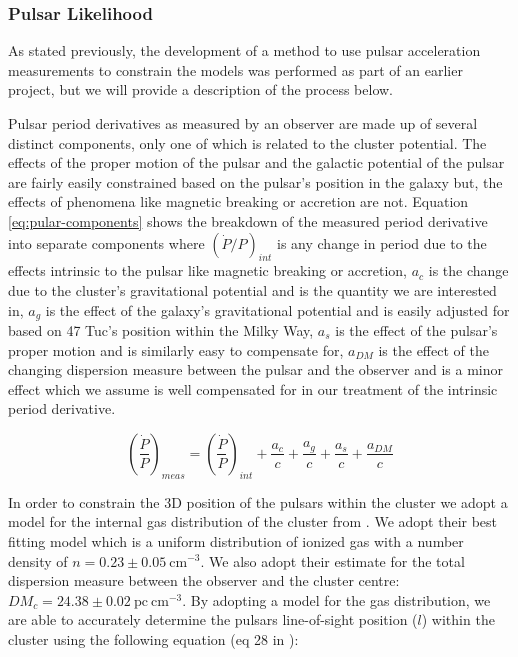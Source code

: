 \subsubsection{Pulsar Likelihood}

As stated previously, the development of a method to use pulsar acceleration measurements to
constrain the models was performed as part of an earlier project, but we will provide a description
of the process below.




Pulsar period derivatives as measured by an observer are made up of several distinct components,
only one of which is related to the cluster potential. The effects of the proper motion of the
pulsar and the galactic potential of the pulsar are fairly easily constrained based on the pulsar's
position in the galaxy but, the effects of phenomena like magnetic breaking or accretion are not.
Equation \ref{eq:pular-components} shows the breakdown of the measured period derivative into
separate components where $(\dot{P}/P)_{int}$ is any change in period due to the effects intrinsic
to the pulsar like magnetic breaking or accretion, $a_c$ is the change due to the cluster's
gravitational potential and is the quantity we are interested in, $a_g$ is the effect of the
galaxy's gravitational potential and is easily adjusted for based on 47 Tuc's position within the
Milky Way, $a_s$ is the effect of the pulsar's proper motion and is similarly easy to compensate
for, $a_{DM}$ is the effect of the changing dispersion measure between the pulsar and the observer
and is a minor effect which we assume is well compensated for in our treatment of the intrinsic
period derivative.

\begin{equation}
    \left(\frac{\dot{P}}{P}\right)_{meas} = \left(\frac{\dot{P}}{P}\right)_{int} + \frac{a_c}{c} +
    \frac{a_g}{c} + \frac{a_s}{c} + \frac{a_{DM}}{c}
    \label{eq:pular-components}
\end{equation}



In order to constrain the 3D position of the pulsars within the cluster we adopt a model for the
internal gas distribution of the cluster from \citet{Abbate2018}. We adopt their best fitting model
which is a uniform distribution of ionized gas with a number density of $n = 0.23 \pm 0.05 \
    \text{cm}^{-3}$. We also adopt their estimate for the total dispersion measure between the observer
and the cluster centre: $DM_c = 24.38 \pm 0.02 \ \mathrm{pc \ cm}^{-3}$. By adopting a model for the
gas distribution, we are able to accurately determine the pulsars line-of-sight position ($l$)
within the cluster using the following equation (eq 28 in \citet{Abbate2018}):

